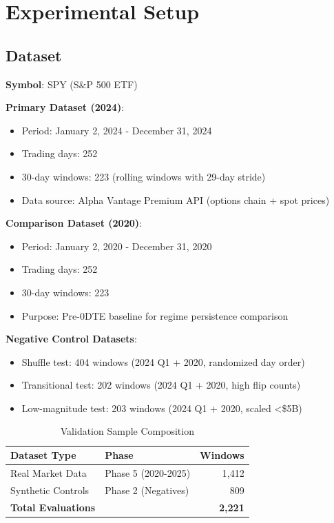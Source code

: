 \section{Experimental Setup}

\subsection{Dataset}

\textbf{Symbol}: SPY (S\&P 500 ETF)

\textbf{Primary Dataset (2024)}:
\begin{itemize}
\item Period: January 2, 2024 - December 31, 2024
\item Trading days: 252
\item 30-day windows: 223 (rolling windows with 29-day stride)
\item Data source: Alpha Vantage Premium API (options chain + spot prices)
\end{itemize}

\textbf{Comparison Dataset (2020)}:
\begin{itemize}
\item Period: January 2, 2020 - December 31, 2020
\item Trading days: 252
\item 30-day windows: 223
\item Purpose: Pre-0DTE baseline for regime persistence comparison
\end{itemize}

\textbf{Negative Control Datasets}:
\begin{itemize}
\item Shuffle test: 404 windows (2024 Q1 + 2020, randomized day order)
\item Transitional test: 202 windows (2024 Q1 + 2020, high flip counts)
\item Low-magnitude test: 203 windows (2024 Q1 + 2020, scaled <\$5B)
\end{itemize}

\begin{table}[ht]
\centering
\caption{Validation Sample Composition}
\begin{tabular}{llr}
\toprule
\textbf{Dataset Type} & \textbf{Phase} & \textbf{Windows} \\
\midrule
Real Market Data & Phase 5 (2020-2025) & 1,412 \\
Synthetic Controls & Phase 2 (Negatives) & 809 \\
\midrule
\textbf{Total Evaluations} & & \textbf{2,221} \\
\bottomrule
\end{tabular}
\end{table}

